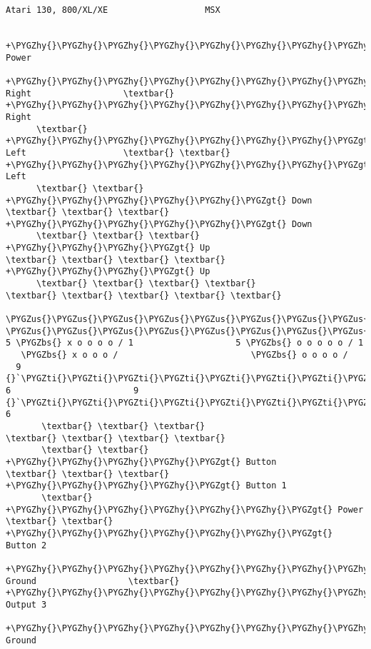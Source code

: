 \documentclass[a4paper,8pt,english]{sphinxmanual}
\def\PYGZbs{\char`\\}
\def\PYGZus{\char`\_}
\def\PYGZgt{\char`\>}
\def\PYGZhy{\char`\-}
\def\PYGZsq{\char`\'}
\def\PYGZti{\char`\~}
\renewcommand\PYGZsq{\textquotesingle}
\begin{document}
\begin{Verbatim}[commandchars=\\\{\}]
        Atari 130, 800/XL/XE                   MSX

                                         +\PYGZhy{}\PYGZhy{}\PYGZhy{}\PYGZhy{}\PYGZhy{}\PYGZhy{}\PYGZhy{}\PYGZhy{}\PYGZhy{}\PYGZhy{}\PYGZhy{}\PYGZgt{} Power
      +\PYGZhy{}\PYGZhy{}\PYGZhy{}\PYGZhy{}\PYGZhy{}\PYGZhy{}\PYGZhy{}\PYGZhy{}\PYGZhy{}\PYGZgt{} Right                  \textbar{} +\PYGZhy{}\PYGZhy{}\PYGZhy{}\PYGZhy{}\PYGZhy{}\PYGZhy{}\PYGZhy{}\PYGZhy{}\PYGZhy{}\PYGZgt{} Right
      \textbar{} +\PYGZhy{}\PYGZhy{}\PYGZhy{}\PYGZhy{}\PYGZhy{}\PYGZhy{}\PYGZhy{}\PYGZgt{} Left                   \textbar{} \textbar{} +\PYGZhy{}\PYGZhy{}\PYGZhy{}\PYGZhy{}\PYGZhy{}\PYGZhy{}\PYGZhy{}\PYGZgt{} Left
      \textbar{} \textbar{} +\PYGZhy{}\PYGZhy{}\PYGZhy{}\PYGZhy{}\PYGZhy{}\PYGZgt{} Down                   \textbar{} \textbar{} \textbar{} +\PYGZhy{}\PYGZhy{}\PYGZhy{}\PYGZhy{}\PYGZhy{}\PYGZgt{} Down
      \textbar{} \textbar{} \textbar{} +\PYGZhy{}\PYGZhy{}\PYGZhy{}\PYGZgt{} Up                     \textbar{} \textbar{} \textbar{} \textbar{} +\PYGZhy{}\PYGZhy{}\PYGZhy{}\PYGZgt{} Up
      \textbar{} \textbar{} \textbar{} \textbar{}                            \textbar{} \textbar{} \textbar{} \textbar{} \textbar{}
  \PYGZus{}\PYGZus{}\PYGZus{}\PYGZus{}\PYGZus{}\PYGZus{}\PYGZus{}\PYGZus{}\PYGZus{}\PYGZus{}\PYGZus{}\PYGZus{}\PYGZus{}                        \PYGZus{}\PYGZus{}\PYGZus{}\PYGZus{}\PYGZus{}\PYGZus{}\PYGZus{}\PYGZus{}\PYGZus{}\PYGZus{}\PYGZus{}\PYGZus{}\PYGZus{}
5 \PYGZbs{} x o o o o / 1                    5 \PYGZbs{} o o o o o / 1
   \PYGZbs{} x o o o /                          \PYGZbs{} o o o o /
  9 {}`\PYGZti{}\PYGZti{}\PYGZti{}\PYGZti{}\PYGZti{}\PYGZti{}\PYGZti{}\PYGZsq{} 6                        9 {}`\PYGZti{}\PYGZti{}\PYGZti{}\PYGZti{}\PYGZti{}\PYGZti{}\PYGZti{}\PYGZsq{} 6
       \textbar{} \textbar{} \textbar{}                              \textbar{} \textbar{} \textbar{} \textbar{}
       \textbar{} \textbar{} +\PYGZhy{}\PYGZhy{}\PYGZhy{}\PYGZhy{}\PYGZgt{} Button                  \textbar{} \textbar{} \textbar{} +\PYGZhy{}\PYGZhy{}\PYGZhy{}\PYGZhy{}\PYGZgt{} Button 1
       \textbar{} +\PYGZhy{}\PYGZhy{}\PYGZhy{}\PYGZhy{}\PYGZhy{}\PYGZhy{}\PYGZgt{} Power                   \textbar{} \textbar{} +\PYGZhy{}\PYGZhy{}\PYGZhy{}\PYGZhy{}\PYGZhy{}\PYGZhy{}\PYGZgt{} Button 2
       +\PYGZhy{}\PYGZhy{}\PYGZhy{}\PYGZhy{}\PYGZhy{}\PYGZhy{}\PYGZhy{}\PYGZhy{}\PYGZgt{} Ground                  \textbar{} +\PYGZhy{}\PYGZhy{}\PYGZhy{}\PYGZhy{}\PYGZhy{}\PYGZhy{}\PYGZhy{}\PYGZhy{}\PYGZgt{} Output 3
                                          +\PYGZhy{}\PYGZhy{}\PYGZhy{}\PYGZhy{}\PYGZhy{}\PYGZhy{}\PYGZhy{}\PYGZhy{}\PYGZhy{}\PYGZhy{}\PYGZgt{} Ground


\end{Verbatim}
\end{document}
